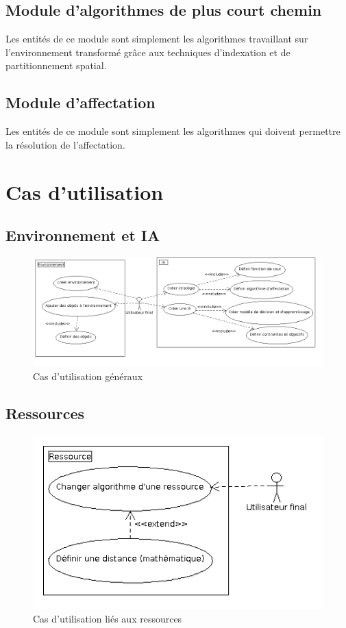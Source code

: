%
\subsection{Module d'algorithmes de plus court chemin}

Les entités de ce module sont simplement les algorithmes travaillant sur l'environnement transformé grâce aux techniques d'indexation et de partitionnement spatial.

%
\subsection{Module d'affectation}

Les entités de ce module sont simplement les algorithmes qui doivent permettre la résolution de l'affectation. 


%
\newpage
\section{Cas d'utilisation}

\subsection{Environnement et IA}
\begin{figure}[!h]\centering
   \includegraphics[scale=0.45]{images/uc_main.png}
   \caption{\label{uc_main} Cas d'utilisation généraux}
\end{figure}
\subsection{Ressources}
\begin{figure}[!h]\centering
   \includegraphics[scale=0.6]{images/uc_ressource.png}
   \caption{\label{uc_main} Cas d'utilisation liés aux ressources}
\end{figure}
\newpage
